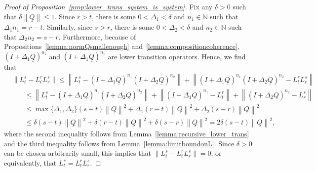 \documentclass[10pt,a4paper]{paper}
\theoremstyle{definition}
\newcommand{\nats}{\mathbb{N}}
\newcommand{\lrate}{\underline{Q}}
\newcommand{\norm}[1]{\left\lVert #1 \right\rVert}
\begin{document}
\begin{proof}[Proof of Proposition~\ref{prop:lower_trans_system_is_system}]
Fix any $\delta>0$ such that $\delta\norm{\lrate}\leq1$. Since $r>t$, there is some $0<\Delta_1<\delta$ and $n_1\in\nats$ such that $\Delta_1 n_1=r-t$. Similarly, since $s>r$, there is some $0<\Delta_2<\delta$ and $n_2\in\nats$ such that $\Delta_2 n_2=s-r$. Furthermore, because of Propositions~\ref{lemma:normQsmallenough} and~\ref{lemma:compositioncoherence}, $(I+\Delta_1\lrate)^{n_1}$ and $(I+\Delta_1\lrate)^{n_1}$ are lower transition operators. Hence, we find that
\begin{align*}
&\norm{L_t^s-L_t^rL_r^s}
\leq
\norm{L_t^s-(I+\Delta_1\lrate)^{n_1}(I+\Delta_2\lrate)^{n_2}}
+
\norm{(I+\Delta_1\lrate)^{n_1}(I+\Delta_2\lrate)^{n_2}-L_t^rL_r^s}\\
&~~~~~~~~\leq
\norm{L_t^s-(I+\Delta_1\lrate)^{n_1}(I+\Delta_2\lrate)^{n_2}}
+
\norm{(I+\Delta_1\lrate)^{n_1}-L_t^r}
+
\norm{(I+\Delta_2\lrate)^{n_2}-L_r^s}\\
&~~~~~~~~\leq
\max\{\Delta_1,\Delta_2\}(s-t)\norm{\lrate}^2
+
\Delta_1(r-t)\norm{\lrate}^2
+
\Delta_2(s-r)\norm{\lrate}^2\\
&~~~~~~~~\leq
\delta(s-t)\norm{\lrate}^2
+
\delta(r-t)\norm{\lrate}^2
+
\delta(s-r)\norm{\lrate}^2
=
2\delta(s-t)\norm{\lrate}^2,
\end{align*}
where the second inequality follows from Lemma~\ref{lemma:recursive_lower_trans} and the third inequality follows from Lemma~\ref{lemma:limitboundonL}. Since $\delta>0$ can be chosen arbitrarily small, this implies that $\norm{L_t^s-L_t^rL_r^s}=0$, or equivalently, that $L_t^s=L_t^rL_r^s$.

\end{proof}
\end{document}
